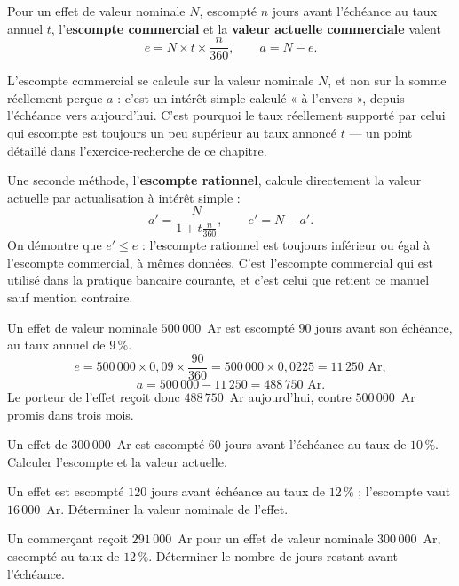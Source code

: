 \begin{theoreme}
Pour un effet de valeur nominale $N$, escompté $n$ jours avant l'échéance au
taux annuel $t$, l'\textbf{escompte commercial} et la \textbf{valeur
actuelle commerciale} valent
\[
  e = N \times t \times \frac{n}{360}, \qquad
  a = N-e .
\]
\end{theoreme}

\begin{avertissement}
L'escompte commercial se calcule sur la valeur nominale $N$, et non sur la
somme réellement perçue $a$ : c'est un intérêt simple calculé « à
l'envers », depuis l'échéance vers aujourd'hui. C'est pourquoi le taux
réellement supporté par celui qui escompte est toujours un peu supérieur au
taux annoncé $t$ — un point détaillé dans l'exercice-recherche de ce
chapitre.
\end{avertissement}

\begin{remarque}
Une seconde méthode, l'\textbf{escompte rationnel}, calcule directement la
valeur actuelle par actualisation à intérêt simple :
\[
  a' = \frac{N}{1+t\frac{n}{360}}, \qquad e' = N-a' .
\]
On démontre que $e' \leq e$ : l'escompte rationnel est toujours inférieur ou
égal à l'escompte commercial, à mêmes données. C'est l'escompte commercial
qui est utilisé dans la pratique bancaire courante, et c'est celui que
retient ce manuel sauf mention contraire.
\end{remarque}

\begin{exemple}
Un effet de valeur nominale $500\,000$~Ar est escompté $90$ jours avant son
échéance, au taux annuel de $9\,\%$.
\[
  e = 500\,000 \times 0{,}09 \times \frac{90}{360}
  = 500\,000 \times 0{,}0225 = 11\,250 \text{ Ar},
\]
\[
  a = 500\,000-11\,250 = 488\,750 \text{ Ar}.
\]
Le porteur de l'effet reçoit donc $488\,750$~Ar aujourd'hui, contre
$500\,000$~Ar promis dans trois mois.
\end{exemple}

\begin{entrainement}[escompte]
\exo[\niveau{1}] Un effet de $300\,000$~Ar est escompté $60$ jours avant
l'échéance au taux de $10\,\%$. Calculer l'escompte et la valeur actuelle.

\exo[\niveau{2}] Un effet est escompté $120$ jours avant échéance au taux de
$12\,\%$ ; l'escompte vaut $16\,000$~Ar. Déterminer la valeur nominale de
l'effet.

\exo[\niveau{2}] Un commerçant reçoit $291\,000$~Ar pour un effet de valeur
nominale $300\,000$~Ar, escompté au taux de $12\,\%$. Déterminer le nombre de
jours restant avant l'échéance.
\end{entrainement}

